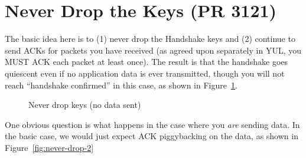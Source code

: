 \documentclass{article}
\begin{document}
\section{Never Drop the Keys (PR 3121)}
\label{sec:never-drop-keys}

The basic idea here is to (1) never drop the Handshake keys
and (2) continue to send ACKs for packets you have received
(as agreed upon separately in YUL, you MUST ACK each
packet at least once). The result is that the handshake
goes quiescent even if no application data is ever transmitted,
though you will not reach ``handshake confirmed'' in this
case, as shown in Figure~\ref{fig:never-drop-1}.

\begin{figure}[H]
\begin{center}
\end{center}
\caption{Never drop keys (no data sent)}
\label{fig:never-drop-1}
\end{figure}


One obvious question is what happens in the case where you
\emph{are} sending data. In the basic case, we would just
expect ACK piggybacking on the data, as shown in Figure~\ref{fig:never-drop-2}
\end{document}
